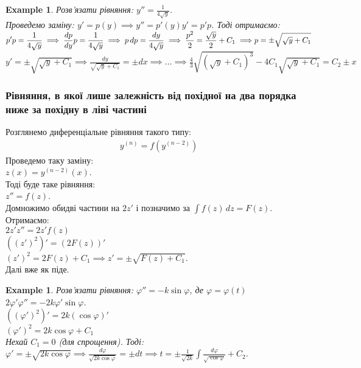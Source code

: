 \documentclass[a4paper, 10pt]{article}
\theoremstyle{theoremdd}
\theoremstyle{theoremdd}
\theoremstyle{theoremdd}
\theoremstyle{theoremdd}
\newtheorem{example}[theorem]{Example}
\theoremstyle{theoremdd}
\theoremstyle{theoremdd}
\theoremstyle{theoremdd}
\theoremstyle{theoremdd}
\begin{document}
	\begin{example}
 Розв'язати рівняння: $\displaystyle y'' = \frac{1}{4\sqrt{y}}$.\\
	Проведемо заміну: $y'=p(y) \implies y'' = p'(y)y' = p'p$. Тоді отримаємо:\\
	$\displaystyle p'p = \frac{1}{4\sqrt{y}} \implies \frac{dp}{dy} p = \frac{1}{4\sqrt{y}} \implies p\,dp = \frac{dy}{4\sqrt{y}} \implies \frac{p^2}{2} = \frac{\sqrt{y}}{2} + C_1 \implies \\ p = \pm \sqrt{\sqrt{y}+C_1}$\\
	$\displaystyle y' = \pm \sqrt{\sqrt{y}+C_1} \implies \frac{dy}{\sqrt{\sqrt{y}+C_1}} = \pm dx \implies \dots \implies \frac{4}{3}\sqrt{(\sqrt{y}+C_1)^3} - 4C_1\sqrt{\sqrt{y}+C_1} = C_2 \pm x$
	\end{example}
	
	\subsubsection{Рівняння, в якої лише залежність від похідної на два порядка ниже за похідну в ліві частині}
	Розглянемо диференціальне рівняння такого типу:
	\begin{align*}
	y^{(n)} = f(y^{(n-2)})
	\end{align*}
	Проведемо таку заміну: \\
	$z(x) = y^{(n-2)}(x)$.\\
	Тоді буде таке рівняння:\\
	$z'' = f(z)$.\\
	Домножимо обидві частини на $2z'$ і позначимо за $\displaystyle \int f(z)\,dz = F(z)$. Отримаємо:\\
	$2z'z'' = 2z'f(z)$\\
	$((z')^2)' = (2F(z))'$\\
	$(z')^2 = 2F(z) + C_1 \implies z' = \displaystyle \pm \sqrt{F(z)+C_1}$.\\
	Далі вже як піде.
		
	\begin{example}
 Розв'язати рівняння: $\varphi'' = -k \sin \varphi$, де $\varphi = \varphi(t)$\\
	$2 \varphi' \varphi'' = -2k \varphi' \sin \varphi$.\\
	$((\varphi')^2)' = 2k(\cos \varphi)'$\\
	$(\varphi')^2 = 2k\cos \varphi + C_1$\\
	Нехай $C_1 = 0$ (для спрощення). Тоді:\\
	$\varphi' = \pm \sqrt{2k\cos \varphi} \implies \displaystyle \frac{d\varphi}{\sqrt{2k \cos \varphi}} = \pm dt \implies t = \pm \frac{1}{\sqrt{2k}} \int \frac{d\varphi}{\sqrt{\cos\varphi}} + C_2$.
	\end{example}
	
\end{document}
